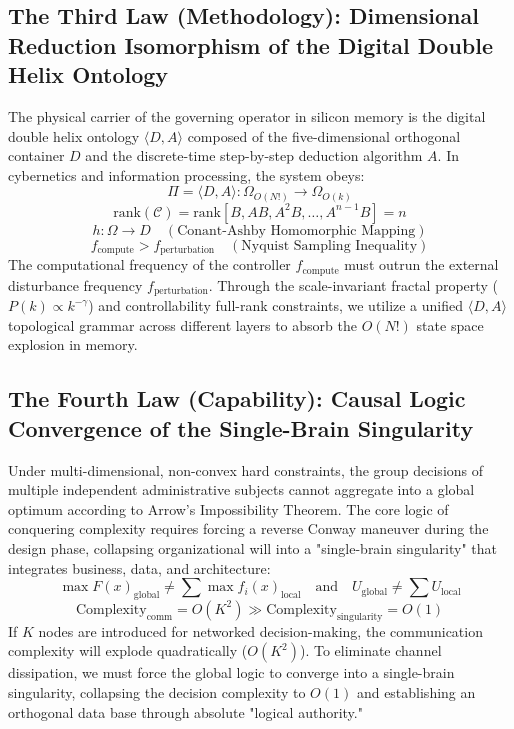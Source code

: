 \documentclass[11pt,a4paper]{article}
\begin{document}
\subsection*{The Third Law (Methodology): Dimensional Reduction Isomorphism of the Digital Double Helix Ontology}
The physical carrier of the governing operator in silicon memory is the digital double helix ontology $\langle D, A \rangle$ composed of the five-dimensional orthogonal container $D$ and the discrete-time step-by-step deduction algorithm $A$. In cybernetics and information processing, the system obeys:
\begin{equation}
    \Pi = \langle D, A \rangle : \Omega_{O(N!)} \longrightarrow \Omega_{O(k)}
\end{equation}
\begin{equation}\label{controllability}
    \text{rank}(\mathcal{C}) = \text{rank}\left[ B, AB, A^2B, \dots, A^{n-1}B \right] = n
\end{equation}
\begin{equation}
    h: \Omega \longrightarrow D \quad (\text{Conant-Ashby Homomorphic Mapping})
\end{equation}
\begin{equation}\label{sampling}
    f_{\text{compute}} > f_{\text{perturbation}} \quad (\text{Nyquist Sampling Inequality})
\end{equation}
The computational frequency of the controller $f_{\text{compute}}$ must outrun the external disturbance frequency $f_{\text{perturbation}}$. Through the scale-invariant fractal property ($P(k) \propto k^{-\gamma}$) and controllability full-rank constraints, we utilize a unified $\langle D, A \rangle$ topological grammar across different layers to absorb the $O(N!)$ state space explosion in memory.

\subsection*{The Fourth Law (Capability): Causal Logic Convergence of the Single-Brain Singularity}
Under multi-dimensional, non-convex hard constraints, the group decisions of multiple independent administrative subjects cannot aggregate into a global optimum according to Arrow's Impossibility Theorem. The core logic of conquering complexity requires forcing a reverse Conway maneuver during the design phase, collapsing organizational will into a "single-brain singularity" that integrates business, data, and architecture:
\begin{equation}
    \max F(x)_{\text{global}} \neq \sum \max f_i(x)_{\text{local}} \quad \text{and} \quad U_{\text{global}} \neq \sum U_{\text{local}}
\end{equation}
\begin{equation}
    \text{Complexity}_{\text{comm}} = O(K^2) \gg \text{Complexity}_{\text{singularity}} = O(1)
\end{equation}
If $K$ nodes are introduced for networked decision-making, the communication complexity will explode quadratically ($O(K^2)$). To eliminate channel dissipation, we must force the global logic to converge into a single-brain singularity, collapsing the decision complexity to $O(1)$ and establishing an orthogonal data base through absolute "logical authority."
\end{document}
